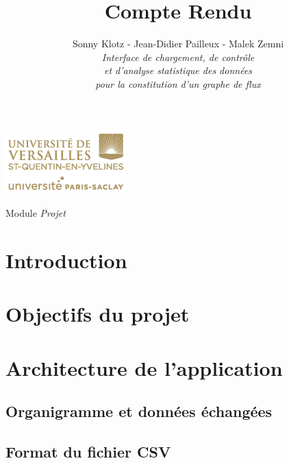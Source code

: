 

\title{\vspace{\fill}\textbf{\Huge Compte Rendu}}
\author{
	Sonny Klotz - Jean-Didier Pailleux - Malek Zemni
	\vspace{2em}\\
	\textit{Interface de chargement, de contrôle}\\\textit{et d’analyse statistique des données}\\\textit{pour la constitution d’un graphe de flux}
	\vspace{2em}
}


\clearpage
\maketitle\vspace{9em}
\begin{center}\includegraphics[scale=0.7]{../Cahier/logo.png}\end{center}
\begin{flushright}Module \textit{Projet}\end{flushright}
\newpage
\tableofcontents
\newpage\clearpage{}

	\section*{Introduction}
	
	\section{Objectifs du projet}
	\section{Architecture de l'application}
		\subsection{Organigramme et données échangées}
		\subsection{Format du fichier CSV}
